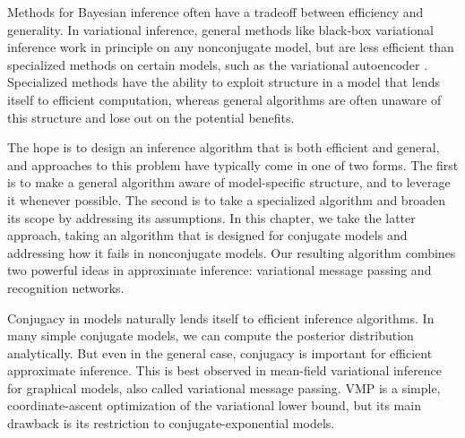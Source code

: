 Methods for Bayesian inference
often have a tradeoff between
efficiency and generality.
In variational inference,
general methods like black-box variational inference \citep{Ranganath2014}
work in principle on any nonconjugate model,
but are less efficient
than specialized methods on certain models,
such as the variational autoencoder \citep[VAE; ][]{Kingma2013, Rezende2014}. 
Specialized
methods have the ability to
exploit structure in a model
that lends itself to efficient computation,
whereas general algorithms are often
unaware of this structure and lose out on the potential 
benefits.

The hope is to design an inference algorithm
that is both efficient and general,
and approaches to this problem have typically come in one of two forms.
The first is to make a general algorithm
aware of model-specific structure,
and to leverage it whenever possible.
The second is to take a specialized
algorithm and broaden its scope
by addressing its assumptions.
In this chapter, we take the latter approach,
taking an algorithm
that is designed for conjugate models
and addressing how it fails in nonconjugate models.
Our resulting algorithm combines two powerful ideas 
in approximate inference: variational message
passing \citep[VMP; ][]{Winn2005} and recognition networks.


Conjugacy in models naturally lends itself
to efficient inference algorithms.
In many simple conjugate models,
we can compute the posterior distribution analytically.
But even in the general case, conjugacy is important
for efficient approximate inference.
This is best observed in mean-field variational inference
for graphical models, also called variational message passing.
VMP is a simple, coordinate-ascent optimization of the
variational lower bound,
but its main drawback is its restriction
to conjugate-exponential models.

